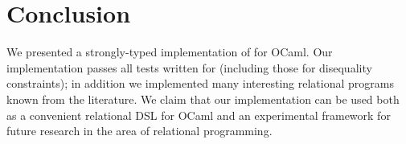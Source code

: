 \section{Conclusion}

We presented a strongly-typed implementation of \miniKanren for OCaml. Our implementation
passes all tests written for \miniKanren (including those for disequality constraints);
in addition we implemented many interesting relational programs known from
the literature. We claim that our implementation can be used both as a convenient
relational DSL for OCaml and an experimental framework for future research in the area of
relational programming.

